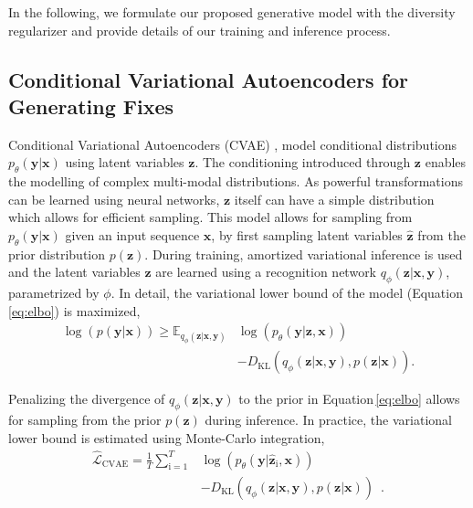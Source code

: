\documentclass[runningheads]{llncs}
\newcommand{\equref}{Equation}
\begin{document}
In the following, we formulate our proposed generative model with the diversity regularizer and provide details of our training and inference process.  

\subsection{Conditional Variational Autoencoders for Generating Fixes}
Conditional Variational Autoencoders (CVAE) \cite{cvae15sohn}, model conditional distributions $p_{\theta}(\textbf{y} | \textbf{x})$ using latent variables  $\textbf{z}$. The conditioning introduced through $\textbf{z}$ enables the modelling of complex multi-modal distributions. As powerful transformations can be learned using neural networks, $\textbf{z}$ itself can have a simple distribution which allows for efficient sampling. This model allows for sampling from $p_{\theta}(\textbf{y} | \textbf{x})$ given an input sequence $\textbf{x}$, by first sampling latent variables $\hat{\textbf{z}}$ from the prior distribution $p({\textbf{z}})$. During training, amortized variational inference is used and the latent variables $\textbf{z}$ are learned using a recognition network $q_{\phi}(\textbf{z} | \textbf{x}, \textbf{y})$, parametrized by $\phi$.  In detail, the variational lower bound of the model (\equref \,\ref{eq:elbo}) is maximized,
\begin{equation}\label{eq:elbo}\tag{1}
\begin{aligned}
    \log(p(\textbf{y} | \textbf{x})) \geq \mathbb{E}_{q_{\phi}(\textbf{z} | \textbf{x}, \textbf{y})} &\log( p_{\theta}(\textbf{y} | \textbf{z}, \textbf{x}) ) \nonumber \\ &- D_\text{KL}({q_{\phi}(\textbf{z} | \textbf{x}, \textbf{y})},{p(\textbf{z} | \textbf{x})}).\end{aligned}
\end{equation}

Penalizing the divergence of $q_{\phi}(\textbf{z} | \textbf{x}, \textbf{y})$ to the prior in \equref \,\ref{eq:elbo} allows for sampling from the prior $p({\textbf{z}})$ during inference. In practice, the variational lower bound is estimated using Monte-Carlo integration,
\begin{equation}\label{eq:cvae}\tag{2}
\begin{aligned}
\hat{\mathcal{L}}_{\text{CVAE}} = \frac{1}{T}\sum\limits_{\text{i}=1}^{T} &\log( p_{\theta}(\textbf{y} | \hat{\textbf{z}}_{\text{i}}, \textbf{x}) ) 
 \\&- D_\text{KL}({q_{\phi}(\textbf{z} | \textbf{x}, \textbf{y})},{p(\textbf{z} | \textbf{x})})\enspace{.}
 \end{aligned}
\end{equation}
\end{document}
